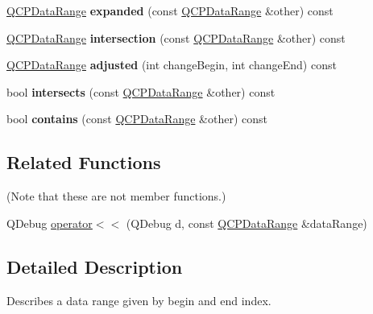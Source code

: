 \begin{DoxyCompactItemize}
\item 
\hyperlink{class_q_c_p_data_range}{Q\+C\+P\+Data\+Range} {\bfseries expanded} (const \hyperlink{class_q_c_p_data_range}{Q\+C\+P\+Data\+Range} \&other) const \hypertarget{class_q_c_p_data_range_a92eb8e85db62f0f833486fa4521fb586}{}\label{class_q_c_p_data_range_a92eb8e85db62f0f833486fa4521fb586}

\item 
\hyperlink{class_q_c_p_data_range}{Q\+C\+P\+Data\+Range} {\bfseries intersection} (const \hyperlink{class_q_c_p_data_range}{Q\+C\+P\+Data\+Range} \&other) const \hypertarget{class_q_c_p_data_range_a2c56cbc35c3beaed34fca1839d570520}{}\label{class_q_c_p_data_range_a2c56cbc35c3beaed34fca1839d570520}

\item 
\hyperlink{class_q_c_p_data_range}{Q\+C\+P\+Data\+Range} {\bfseries adjusted} (int change\+Begin, int change\+End) const \hypertarget{class_q_c_p_data_range_a7a7a144cd3df55a6e011b9a84f0f8b69}{}\label{class_q_c_p_data_range_a7a7a144cd3df55a6e011b9a84f0f8b69}

\item 
bool {\bfseries intersects} (const \hyperlink{class_q_c_p_data_range}{Q\+C\+P\+Data\+Range} \&other) const \hypertarget{class_q_c_p_data_range_afda3603f6ca7cb5c518cdaeea45af267}{}\label{class_q_c_p_data_range_afda3603f6ca7cb5c518cdaeea45af267}

\item 
bool {\bfseries contains} (const \hyperlink{class_q_c_p_data_range}{Q\+C\+P\+Data\+Range} \&other) const \hypertarget{class_q_c_p_data_range_a691620b718e4bcefb77bcdde88bd1b34}{}\label{class_q_c_p_data_range_a691620b718e4bcefb77bcdde88bd1b34}

\end{DoxyCompactItemize}
\subsection*{Related Functions}
(Note that these are not member functions.) \begin{DoxyCompactItemize}
\item 
Q\+Debug \hyperlink{class_q_c_p_data_range_a486dd7af8a090ed069672e3510e6a082}{operator$<$$<$} (Q\+Debug d, const \hyperlink{class_q_c_p_data_range}{Q\+C\+P\+Data\+Range} \&data\+Range)
\end{DoxyCompactItemize}


\subsection{Detailed Description}
Describes a data range given by begin and end index. 

